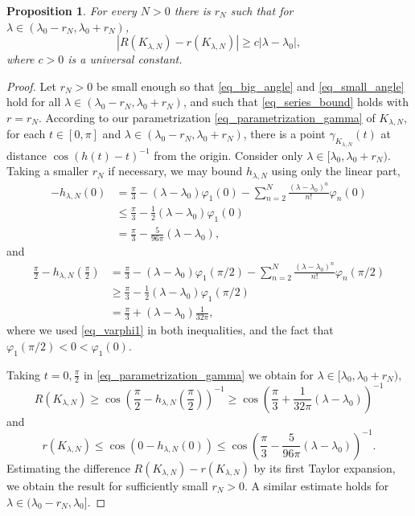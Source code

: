 \documentclass{amsart}
\newtheorem{proposition}{Proposition}
\begin{document}
\begin{proposition}
	\label{prop_bound_Rr}
	For every $N>0$ there is $r_N$ such that for $\lambda \in (\lambda_0-r_N, \lambda_0+r_N)$,
	\[ |R(K_{\lambda,N}) - r(K_{\lambda,N})| \geq c |\lambda - \lambda_0|, \]
	where $c>0$ is a universal constant.
\end{proposition}
\begin{proof}
	Let $r_N>0$ be small enough so that \eqref{eq_big_angle} and \eqref{eq_small_angle} hold for all $\lambda \in (\lambda_0-r_N,\lambda_0+ r_N)$, and such that \eqref{eq_series_bound} holds with $r = r_N$.
	According to our parametrization \eqref{eq_parametrization_gamma} of $K_{\lambda,N}$, for each $t \in [0,\pi]$ and $\lambda \in (\lambda_0-r_N, \lambda_0 + r_N)$, there is a point $\gamma_{K_{\lambda,N}}(t)$ at distance $\cos(h(t)-t)^{-1}$ from the origin.
	Consider only $\lambda \in [\lambda_0, \lambda_0 + r_N)$. Taking a smaller $r_N$ if necessary, we may bound $h_{\lambda,N}$ using only the linear part,
	\begin{align}
		\label{eq_big_angle}
		-h_{\lambda,N}(0) &= \frac \pi 3 - (\lambda-\lambda_0) \varphi_1(0) - \sum_{n=2}^N \frac {(\lambda-\lambda_0)^n}{n!} \varphi_n(0)\\
		&\leq \frac \pi 3 - \frac 12 (\lambda-\lambda_0) \varphi_1(0)\\
		&= \frac \pi 3 - \frac 5{96 \pi} (\lambda-\lambda_0),
	\end{align}
	and
	\begin{align}
		\label{eq_small_angle}
	\frac \pi 2 - h_{\lambda,N}\left(\frac \pi 2\right)
		&= \frac \pi 3 - (\lambda-\lambda_0) \varphi_1(\pi/2) - \sum_{n=2}^N \frac {(\lambda-\lambda_0)^n}{n!} \varphi_n(\pi/2)\\
		&\geq \frac \pi 3 - \frac 12 (\lambda-\lambda_0) \varphi_1(\pi/2)\\
		&= \frac \pi 3 + (\lambda-\lambda_0) \frac 1{32 \pi},
	\end{align}
	where we used \eqref{eq_varphi1} in both inequalities, and the fact that $\varphi_1(\pi/2) < 0 < \varphi_1(0)$.

	Taking $t = 0, \frac \pi 2$ in \eqref{eq_parametrization_gamma} we obtain for $\lambda \in [\lambda_0, \lambda_0 + r_N),$
	\[R(K_{\lambda,N}) \geq \cos\left(\frac \pi 2 - h_{\lambda,N}\left(\frac \pi 2\right)\right)^{-1} \geq \cos(\frac \pi 3 + \frac 1{32 \pi} (\lambda-\lambda_0))^{-1} \]
	and
	\[r(K_{\lambda,N}) \leq \cos(0 - h_{\lambda,N}(0)) \leq \cos(\frac \pi 3 - \frac 5{96 \pi} (\lambda-\lambda_0))^{-1}.\]
	Estimating the difference $R(K_{\lambda,N}) - r(K_{\lambda,N})$ by its first Taylor expansion, we obtain the result for sufficiently small  $r_N>0$.
	A similar estimate holds for $\lambda \in (\lambda_0 - r_N,\lambda_0]$.
\end{proof}
\end{document}
